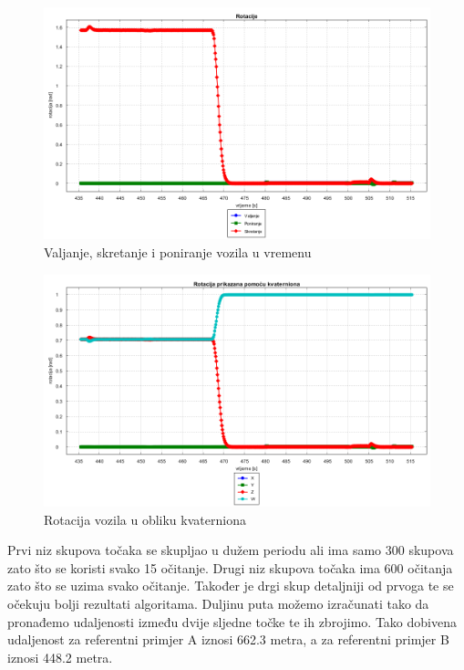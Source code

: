 \begin{figure}[H]
  \includegraphics[scale=0.35]{images/rotacija_vrijeme2.png}
  \caption{Valjanje, skretanje i poniranje vozila u vremenu}
  \label{fig:gt2_rot_vr}
\end{figure}
\begin{figure}[H]
  \includegraphics[scale=0.35]{images/rotacija_kvaterni2.png}
  \caption{Rotacija vozila u obliku kvaterniona}
  \label{fig:gt2_rot_kv}
\end{figure}
Prvi niz skupova točaka se skupljao u dužem periodu ali ima samo 300 skupova zato što se koristi svako 15 očitanje. Drugi niz skupova točaka ima 600 očitanja zato što se uzima svako očitanje. Također je drgi skup detaljniji od prvoga te se očekuju bolji rezultati algoritama. Duljinu puta možemo izračunati tako da pronađemo udaljenosti između dvije sljedne točke te ih zbrojimo. Tako dobivena udaljenost za referentni primjer A iznosi 662.3 metra, a za referentni primjer B iznosi 448.2 metra.